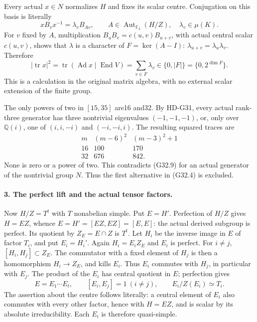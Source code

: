 Every actual \(x\in N\) normalizes \(H\) and fixes its scalar
centre. Conjugation on this basis is literally
\[
 xB_vx^{-1}=\lambda_v B_{A v},\qquad
 A\in\operatorname{Aut}_{\mathbb F_2}(H/Z),\quad\lambda_v\in\mu(K).
 \tag{G32.8}
\]
For \(v\) fixed by \(A\), multiplication
\(B_uB_v=c(u,v)B_{u+v}\), with actual central scalar \(c(u,v)\),
shows that \(\lambda\) is a character of
\(F=\ker(A-I)\): \(\lambda_{u+v}=\lambda_u\lambda_v\).
Therefore
\[
 |\operatorname{tr}x|^2
   =\operatorname{tr}(\operatorname{Ad}x\mid\operatorname{End}V)
   =\sum_{v\in F}\lambda_v
   \in\{0,|F|\} =\{0,2^{\dim F}\}.
 \tag{G32.9}
\]
This is a calculation in the original matrix algebra, with no
external scalar extension of the finite group.

The only powers of two in \([15,35]\) are16 and32. By HD-G31,
every actual rank-three generator has three nontrivial eigenvalues
\((-1,-1,-1)\), or, only over \(\mathbb Q(i)\), one of
\((i,i,-i)\) and \((-i,-i,i)\). The resulting squared traces are
\[
\begin{array}{c|cc}
 m&(m-6)^2&(m-3)^2+1\\\hline
 16&100&170\\
 32&676&842.
\end{array}                                                   \tag{G32.10}
\]
None is zero or a power of two. This contradicts (G32.9) for
an actual generator of the nontrivial group \(N\). Thus the
first alternative in (G32.4) is excluded.

\paragraph{3. The perfect lift and the actual tensor factors.}
Now \(H/Z=T^t\) with \(T\) nonabelian simple. Put \(E=H'\).
Perfection of \(H/Z\) gives \(H=EZ\), whence
\(E=H'=[EZ,EZ]=[E,E]\): the actual derived subgroup is perfect.
Its quotient by \(Z_E=E\cap Z\) is \(T^t\). Let \(H_i\) be the
inverse image in \(E\) of factor \(T_i\), and put \(E_i=H_i'\).
Again \(H_i=E_iZ_E\) and \(E_i\) is perfect. For \(i\ne j\),
\([H_i,H_j]\subset Z_E\). The commutator with a fixed element
of \(H_j\) is then a homomorphism \(H_i\to Z_E\), and kills
\(E_i\). Thus \(E_i\) commutes with \(H_j\), in particular with
\(E_j\). The product of the \(E_i\) has central quotient in
\(E\); perfection gives
\[
 E=E_1\cdots E_t,\qquad [E_i,E_j]=1\ (i\ne j),\qquad
 E_i/Z(E_i)\simeq T_i.
 \tag{G32.11}
\]
The assertion about the centre follows literally: a central
element of \(E_i\) also commutes with every other factor, hence
with \(H=EZ\), and is scalar by its absolute irreducibility.
Each \(E_i\) is therefore quasi-simple.

